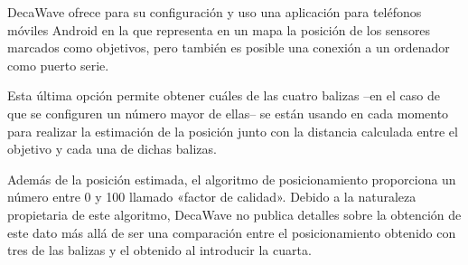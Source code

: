 DecaWave ofrece para su configuración y uso una aplicación para teléfonos móviles Android en la que representa en un mapa la posición de los sensores marcados como objetivos, pero también es posible una conexión a un ordenador como puerto serie.

Esta última opción permite obtener cuáles de las cuatro balizas --en el caso de que se configuren un número mayor de ellas-- se están usando en cada momento para realizar la estimación de la posición junto con la distancia calculada entre el objetivo y cada una de dichas balizas.

Además de la posición estimada, el algoritmo de posicionamiento proporciona un número entre 0 y 100 llamado «factor de calidad».
Debido a la naturaleza propietaria de este algoritmo, DecaWave no publica detalles sobre la obtención de este dato más allá de ser una comparación entre el posicionamiento obtenido con tres de las balizas y el obtenido al introducir la cuarta.

